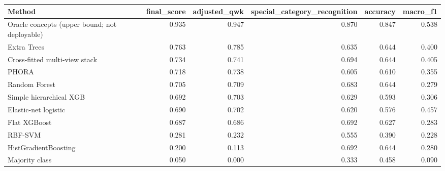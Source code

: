 \begin{tabular}{lrrrrr}
\toprule
Method & final_score & adjusted_qwk & special_category_recognition & accuracy & macro_f1 \\
\midrule
Oracle concepts (upper bound; not deployable) & 0.935 & 0.947 & 0.870 & 0.847 & 0.538 \\
Extra Trees & 0.763 & 0.785 & 0.635 & 0.644 & 0.400 \\
Cross-fitted multi-view stack & 0.734 & 0.741 & 0.694 & 0.644 & 0.405 \\
PHORA & 0.718 & 0.738 & 0.605 & 0.610 & 0.355 \\
Random Forest & 0.705 & 0.709 & 0.683 & 0.644 & 0.279 \\
Simple hierarchical XGB & 0.692 & 0.703 & 0.629 & 0.593 & 0.306 \\
Elastic-net logistic & 0.690 & 0.702 & 0.620 & 0.576 & 0.457 \\
Flat XGBoost & 0.687 & 0.686 & 0.692 & 0.627 & 0.283 \\
RBF-SVM & 0.281 & 0.232 & 0.555 & 0.390 & 0.228 \\
HistGradientBoosting & 0.200 & 0.113 & 0.692 & 0.644 & 0.280 \\
Majority class & 0.050 & 0.000 & 0.333 & 0.458 & 0.090 \\
\bottomrule
\end{tabular}
